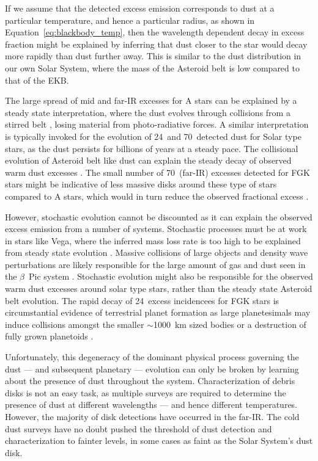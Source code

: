     If we assume that the detected excess emission corresponds to dust at a particular temperature, and hence a particular radius, as shown in Equation~\ref{eq:blackbody_temp}, then the wavelength dependent decay in excess fraction might be explained by inferring that dust closer to the star would decay more rapidly than dust further away. This is similar to the dust distribution in our own Solar System, where the mass of the Asteroid belt is low compared to that of the EKB. 
    
    The large spread of mid and far-IR excesses for A stars can be explained by a steady state interpretation, where the dust evolves through collisions from a stirred belt \citep{Su2006, Wyatt2008}, losing material from photo-radiative forces. A similar interpretation is typically invoked for the evolution of 24\micron\ and 70\micron\ detected dust for Solar type stars, as the dust persists for billions of years at a steady pace. The collisional evolution of Asteroid belt like dust can explain the steady decay of observed warm dust excesses \citep{Wyatt2008}. The small number of 70\micron\ (far-IR) excesses detected for FGK stars might be indicative of less massive disks around these type of stars compared to A stars, which would in turn reduce the observed fractional excess \citep{Wyatt2008}. 
    
    However, stochastic evolution cannot be discounted as it can explain the observed excess emission from a number of systems. Stochastic processes must be at work in stars like Vega, where the inferred mass loss rate is too high to be explained from steady state evolution \citep{Su2006}. Massive collisions of large objects and density wave perturbations are likely responsible for the large amount of gas and dust seen in the $\beta$~Pic system \citep{Telesco2005, Nesvold2015}. Stochastic  evolution might also be responsible for the observed warm dust excesses around solar type stars, rather than the steady state Asteroid belt evolution. The rapid decay of 24\micron\ excess incidencees for FGK stars is circumstantial evidence of terrestrial planet formation as large planetesimals may induce collisions amongst the smaller $\sim$1000~km sized bodies or a destruction of fully grown planetoids \citep{Meyer2008, Wyatt2008}. 
    
    
    Unfortunately, this degeneracy of the dominant physical process governing the dust --- and subsequent planetary --- evolution can only be broken by learning about the presence of dust throughout the system. Characterization of debris disks is not an easy task, as multiple surveys are required to determine the presence of dust at different wavelengths --- and hence different temperatures. However, the majority of disk detections have occurred in the far-IR. The cold dust surveys have no doubt pushed the threshold of dust detection and characterization to fainter levels, in some cases as faint as the Solar System's dust disk.%
    
